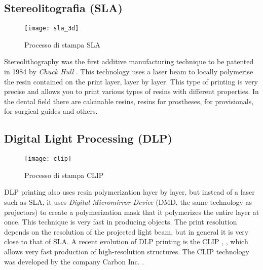 \subsection{Stereolitografia (SLA)}
\begin{wrapfigure} {R} {0.37\textwidth}
\vspace{-40pt}
	\begin{center}
	\texttt{[image: sla\_3d]}
    \caption{Processo di stampa SLA}
    \label{fig:sla_3d}
    \end{center}
\vspace{-40pt}
\end{wrapfigure}
Stereolithography was the first additive manufacturing technique to be patented in 1984 by \emph{Chuck Hull} \parencite{Reference124}. This technology uses a laser beam to locally polymerise the resin contained on the print layer, layer by layer. This type of printing is very precise and allows you to print various types of resins with different properties. In the dental field there are calcinable resins, resins for prostheses, for provisionals, for surgical guides and others.

\subsection{Digital Light Processing (DLP)}
\begin{wrapfigure} {R} {0.37\textwidth}
\vspace{-40pt}
	\begin{center}
	\texttt{[image: clip]}
    \caption{Processo di stampa CLIP}
    \label{fig:clip}
    \end{center}
\vspace{-20pt}
\end{wrapfigure}
DLP printing also uses resin polymerization layer by layer, but instead of a laser such as SLA, it uses \emph{Digital Micromirror Device} (DMD, the same technology as projectors) to create a polymerization mask that it polymerizes the entire layer at once. This technique is very fast in producing objects. The print resolution depends on the resolution of the projected light beam, but in general it is very close to that of SLA. A recent evolution of DLP printing is the CLIP \parencite{Reference121}, \parencite{Reference122}, which allows very fast production of high-resolution structures. The CLIP technology was developed by the company Carbon Inc. \parencite{Reference123}.

